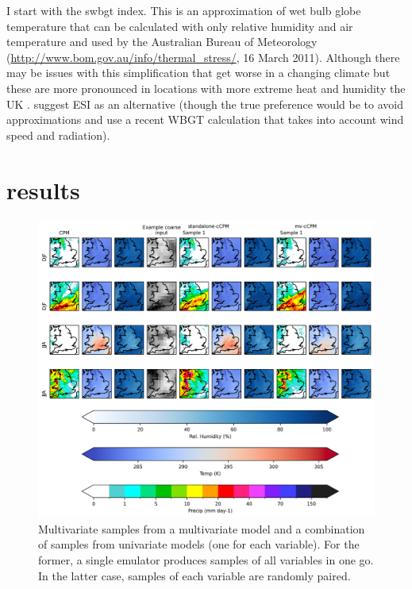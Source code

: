 I start with the \acrfull{swbgt} index. This is an approximation of wet bulb globe temperature that can be calculated with only relative humidity and air temperature \parencite[e.g][]{Blazejczyk2012UTCIcomparison, zhao2015heatstresscmip5, buzan2015heatstress} and used by the Australian Bureau of Meteorology (\url{http://www.bom.gov.au/info/thermal_stress/}, 16 March 2011).
Although there may be issues with this simplification \parencite{kong2022wbgtapproxissues} that get worse in a changing climate but these are more pronounced in locations with more extreme heat and humidity the UK \parencite{qiu2024swbgtbias}. \textcite{kong2022wbgtapproxissues} suggest ESI as an alternative (though the true preference would be to avoid approximations and use a recent WBGT calculation that takes into account wind speed and radiation).


\section{results}
\label{mv:results}

\begin{figure}[ht]
	\centering
	\includegraphics[height=0.35\textheight]{chapters/figures/5_mv/mv-samples.png}
	\caption{Multivariate samples from a multivariate model and a combination of samples from univariate models (one for each variable). For the former, a single emulator produces samples of all variables in one go. In the latter case, samples of each variable are randomly paired.}
	\label{fig:mv-samples}
\end{figure}

